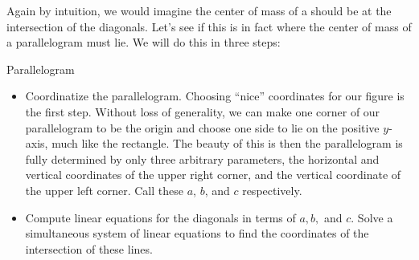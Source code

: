 Again by intuition, we would imagine the center of mass of a  should be at the intersection of the diagonals.  Let's see if this is in fact where the center of mass of a parallelogram must lie.  We will do this in three steps:
\begin{exercise}{Parallelogram \Coffeecup \Coffeecup}

\begin{itemize}

\item Coordinatize the parallelogram.  Choosing ``nice'' coordinates for our figure is the first step.  Without loss of generality, we can make one corner of our parallelogram to be the origin and choose one side to lie on the positive $y$-axis, much like the rectangle.  The beauty of this is then the parallelogram is fully determined by only three arbitrary parameters, the horizontal and vertical coordinates of the upper right corner, and the vertical coordinate of the upper left corner.  Call these $a$, $b$, and $c$ respectively.

 
\item Compute linear equations for the diagonals in terms of $a,b,$ and $c$.  Solve a simultaneous system of linear equations to find the coordinates of the intersection of these lines.

\end{itemize}
\end{exercise}
